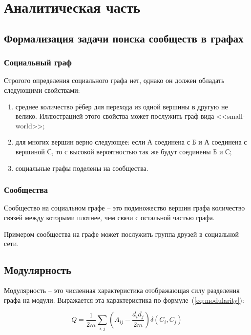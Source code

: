 \chapter{Аналитическая часть}


\section{Формализация задачи поиска сообществ в графах}

\subsection{Социальный граф}

Строгого определения социального графа нет, однако он должен обладать следующими свойствами:

\begin{enumerate}
	\item среднее количество рёбер для перехода из одной вершины в другую не велико. Иллюстрацией этого свойства может послужить граф вида <<small-world>>;
	\item для многих вершин верно следующее: если А соединена с Б и А соединена с вершиной С, то с высокой вероятностью так же будут соединены Б и С;
	\item социальные графы поделены на сообщества.
\end{enumerate}

\subsection{Сообщества}

Сообщество на социальном графе -- это подмножество вершин графа количество связей между которыми плотнее, чем связи с остальной частью графа. 

Примером сообщества на графе может послужить группа друзей в социальной сети.

\section{Модулярность}

Модулярность -- это численная характеристика отображающая силу разделения графа на модули. Выражается эта характеристика по формуле~(\ref{eq:modularity}):

\begin{equation}
	\label{eq:modularity}
	Q = \frac{1}{2m}\sum_{i,j}(A_{ij} - \frac{d_id_j}{2m})\delta(C_i, C_j)
\end{equation}


